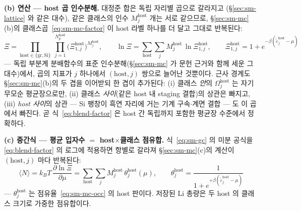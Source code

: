 \textbf{(b) 연산 --- host 곱 인수분해.} 대정준 합은 독립 자리별 곱으로 갈라지고
(\S\ref{sec:sm-lattice} 와 같은 대수), 같은 클래스의 인수 $M_j^\mathrm{host}$ 개는 서로 같으므로,
\S\ref{sec:sm-mc}(b)의 클래스곱~\eqref{eq:sm-mc-factor} 이 host 라벨 하나를 더 달고 그대로 반복된다:
\begin{equation}
\Xi=\prod_{\mathrm{host}\in\{\mathrm{gr},\mathrm{Si}\}}\ \prod_{j=1}^{N_p^\mathrm{host}}
\big(\Xi_{1,j}^{\mathrm{host}}\big)^{M_j^\mathrm{host}},
\qquad
\ln\Xi=\sum_{\mathrm{host}}\sum_{j} M_j^\mathrm{host}\,\ln\Xi_{1,j}^\mathrm{host},
\qquad
\Xi_{1,j}^\mathrm{host}=1+e^{-\beta(\tilde\varepsilon_j^\mathrm{host}-\mu)}
\label{eq:blend-factor}
\end{equation}
--- 독립 부분계 분배함수의 표준 인수분해(\S\ref{sec:sm-mc} 가 문헌 근거와 함께 세운 그 대수)에서, 곱의
지표가 $j$ 하나에서 $(\mathrm{host},j)$ 쌍으로 늘어난 것뿐이다. 근사 경계도 \S\ref{sec:sm-mc}(b)의 두 겹을 이어받되 한 겹이
추가된다: (i) 클래스 \emph{안}의 $\Omega_j^\mathrm{host}$ 는 자기무모순 평균장으로만, (ii) 클래스
\emph{사이}(같은 host 내 staging 결합)의 상관은 빠지고, (iii) \emph{host 사이}의 상관 --- Si 팽창이
흑연 자리에 거는 기계 구속$\cdot$계면 결합 --- 도 이 곱에서 빠진다. 곧 식~\eqref{eq:blend-factor} 은 host
간 독립까지 포함한 평균장 수준에서 정확하다.

\textbf{(c) 중간식 --- 평균 입자수 $=$ host$\times$클래스 점유합.} 식~\eqref{eq:sm-gc} 의 미분
공식을 \eqref{eq:blend-factor} 의 로그에 적용하면 항별로 갈라져 \S\ref{sec:sm-mc}(c)의 계산이
$(\mathrm{host},j)$ 마다 반복된다:
\begin{equation}
\langle N\rangle=k_BT\,\frac{\partial\ln\Xi}{\partial\mu}
=\sum_{\mathrm{host}}\sum_{j} M_j^\mathrm{host}\,\theta_j^\mathrm{host}(\mu),
\qquad
\theta_j^\mathrm{host}=\frac{1}{1+e^{+\beta(\tilde\varepsilon_j^\mathrm{host}-\mu)}}
\label{eq:blend-occ}
\end{equation}
--- $\theta_j^\mathrm{host}$ 는 점유율~\eqref{eq:sm-mc-occ} 의 host 판이다. 저장된 Li 총량은 두 host 의
클래스 크기로 가중한 점유합이다.

